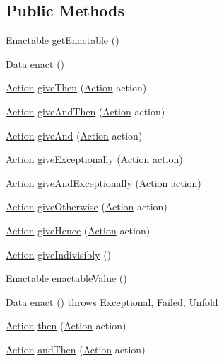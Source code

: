 \subsection*{Public Methods}
\begin{CompactItemize}
\item 
\hyperlink{interfaceEnactable}{Enactable} \hyperlink{classActionImpl_a0}{get\-Enactable} ()
\item 
\hyperlink{interfaceData}{Data} \hyperlink{classActionImpl_a1}{enact} ()
\item 
\hyperlink{interfaceAction}{Action} \hyperlink{classActionImpl_a2}{give\-Then} (\hyperlink{interfaceAction}{Action} action)
\item 
\hyperlink{interfaceAction}{Action} \hyperlink{classActionImpl_a3}{give\-And\-Then} (\hyperlink{interfaceAction}{Action} action)
\item 
\hyperlink{interfaceAction}{Action} \hyperlink{classActionImpl_a4}{give\-And} (\hyperlink{interfaceAction}{Action} action)
\item 
\hyperlink{interfaceAction}{Action} \hyperlink{classActionImpl_a5}{give\-Exceptionally} (\hyperlink{interfaceAction}{Action} action)
\item 
\hyperlink{interfaceAction}{Action} \hyperlink{classActionImpl_a6}{give\-And\-Exceptionally} (\hyperlink{interfaceAction}{Action} action)
\item 
\hyperlink{interfaceAction}{Action} \hyperlink{classActionImpl_a7}{give\-Otherwise} (\hyperlink{interfaceAction}{Action} action)
\item 
\hyperlink{interfaceAction}{Action} \hyperlink{classActionImpl_a8}{give\-Hence} (\hyperlink{interfaceAction}{Action} action)
\item 
\hyperlink{interfaceAction}{Action} \hyperlink{classActionImpl_a9}{give\-Indivisibly} ()
\item 
\hyperlink{interfaceEnactable}{Enactable} \hyperlink{classActionImpl_a10}{enactable\-Value} ()
\item 
\hyperlink{interfaceData}{Data} \hyperlink{classActionImpl_a11}{enact} () throws \hyperlink{classExceptional}{Exceptional}, \hyperlink{classFailed}{Failed}, \hyperlink{classUnfold}{Unfold}
\item 
\hyperlink{interfaceAction}{Action} \hyperlink{classActionImpl_a12}{then} (\hyperlink{interfaceAction}{Action} action)
\item 
\hyperlink{interfaceAction}{Action} \hyperlink{classActionImpl_a13}{and\-Then} (\hyperlink{interfaceAction}{Action} action)
\item 

\end{CompactItemize}

